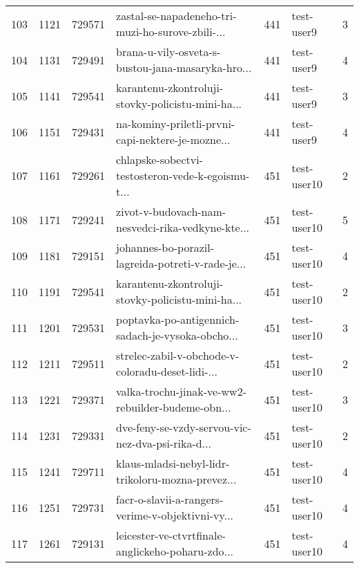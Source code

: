 \begin{tabular}{lrrlrlr}
103  &       1121 &   729571 &  zastal-se-napadeneho-tri-muzi-ho-surove-zbili-... &      441 &                   test-user9 &               3 \\
104  &       1131 &   729491 &  brana-u-vily-osveta-s-bustou-jana-masaryka-hro... &      441 &                   test-user9 &               4 \\
105  &       1141 &   729541 &  karantenu-zkontroluji-stovky-policistu-mini-ha... &      441 &                   test-user9 &               3 \\
106  &       1151 &   729431 &  na-kominy-priletli-prvni-capi-nektere-je-mozne... &      441 &                   test-user9 &               4 \\
107  &       1161 &   729261 &  chlapske-sobectvi-testosteron-vede-k-egoismu-t... &      451 &                  test-user10 &               2 \\
108  &       1171 &   729241 &  zivot-v-budovach-nam-nesvedci-rika-vedkyne-kte... &      451 &                  test-user10 &               5 \\
109  &       1181 &   729151 &  johannes-bo-porazil-lagreida-potreti-v-rade-je... &      451 &                  test-user10 &               4 \\
110  &       1191 &   729541 &  karantenu-zkontroluji-stovky-policistu-mini-ha... &      451 &                  test-user10 &               2 \\
111  &       1201 &   729531 &  poptavka-po-antigennich-sadach-je-vysoka-obcho... &      451 &                  test-user10 &               3 \\
112  &       1211 &   729511 &  strelec-zabil-v-obchode-v-coloradu-deset-lidi-... &      451 &                  test-user10 &               2 \\
113  &       1221 &   729371 &  valka-trochu-jinak-ve-ww2-rebuilder-budeme-obn... &      451 &                  test-user10 &               3 \\
114  &       1231 &   729331 &  dve-feny-se-vzdy-servou-vic-nez-dva-psi-rika-d... &      451 &                  test-user10 &               2 \\
115  &       1241 &   729711 &  klaus-mladsi-nebyl-lidr-trikoloru-mozna-prevez... &      451 &                  test-user10 &               4 \\
116  &       1251 &   729731 &  facr-o-slavii-a-rangers-verime-v-objektivni-vy... &      451 &                  test-user10 &               4 \\
117  &       1261 &   729131 &  leicester-ve-ctvrtfinale-anglickeho-poharu-zdo... &      451 &                  test-user10 &               4 \\

\end{tabular}

